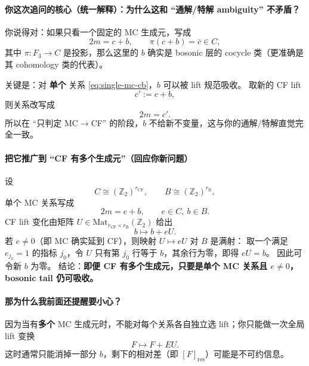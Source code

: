 \documentclass[a4paper,fontset=ubuntu,12pt]{ctexart}
\begin{document}
\paragraph{你这次追问的核心（统一解释）：为什么这和 ``通解/特解 ambiguity'' 不矛盾？}
你说得对：如果只看一个固定的 MC 生成元，写成
\begin{equation}
2m = c + b,\qquad \pi(c+b)=\bar c\in C,
\label{eq:single-mc-cb}
\end{equation}
其中 $\pi:F_3\to C$ 是投影，那么这里的 $b$ 确实是 bosonic 层的 cocycle 类（更准确是其 cohomology 类的代表）。

关键是：对 \textbf{单个} 关系 \eqref{eq:single-mc-cb}，$b$ 可以被 lift 规范吸收。  
取新的 CF lift
\begin{equation}
c':=c+b,
\label{eq:c-lift-absorb-b}
\end{equation}
则关系改写成
\begin{equation}
2m=c'.
\label{eq:single-mc-clean}
\end{equation}
所以在 ``只判定 MC$\to$CF'' 的阶段，$b$ 不给新不变量，这与你的通解/特解直觉完全一致。

\paragraph{把它推广到 ``CF 有多个生成元''（回应你新问题）}
设
\begin{equation}
C\cong (\mathbb{Z}_2)^{r_{\mathrm{CF}}},\qquad
B\cong (\mathbb{Z}_2)^{r_{\mathrm{B}}},
\label{eq:C-B-rank}
\end{equation}
单个 MC 关系写成
\begin{equation}
2m=e+b,\qquad e\in C,\ b\in B.
\label{eq:single-m-vector}
\end{equation}
CF lift 变化由矩阵 $U\in \mathrm{Mat}_{r_{\mathrm{CF}}\times r_{\mathrm{B}}}(\mathbb{Z}_2)$ 给出
\begin{equation}
b\mapsto b+eU.
\label{eq:b-shift-eU}
\end{equation}
若 $e\neq 0$（即 MC 确实延到 CF），则映射 $U\mapsto eU$ 对 $B$ 是满射：
取一个满足 $e_{j_0}=1$ 的指标 $j_0$，令 $U$ 只有第 $j_0$ 行等于 $b$，其余行为零，即得 $eU=b$。
因此可令新 $b$ 为零。  
结论：\textbf{即便 CF 有多个生成元，只要是单个 MC 关系且 $e\neq 0$，bosonic tail 仍可吸收。}

\paragraph{那为什么我前面还提醒要小心？}
因为当有\textbf{多个} MC 生成元时，不能对每个关系各自独立选 lift；你只能做一次全局 lift 变换
\begin{equation}
F\mapsto F+EU.
\label{eq:global-lift-once}
\end{equation}
这时通常只能消掉一部分 $b$，剩下的相对差（即 $[F]_{\mathrm{res}}$）可能是不可约信息。
\end{document}
